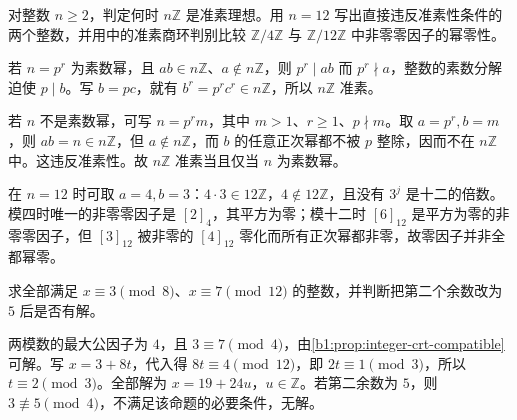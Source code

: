 \begin{exercise}\label{b1:ex:10-primary-integers}
	对整数 \(n\geq2\)，判定何时 \(n\mathbb Z\) 是准素理想。用 \(n=12\) 写出直接违反准素性条件的两个整数，并用中的准素商环判别比较 \(\mathbb Z/4\mathbb Z\) 与 \(\mathbb Z/12\mathbb Z\) 中非零零因子的幂零性。
\end{exercise}
\begin{solution}
	若 \(n=p^r\) 为素数幂，且 \(ab\in n\mathbb Z\)、\(a\notin n\mathbb Z\)，则 \(p^r\mid ab\) 而 \(p^r\nmid a\)，整数的素数分解迫使 \(p\mid b\)。写 \(b=pc\)，就有 \(b^r=p^rc^r\in n\mathbb Z\)，所以 \(n\mathbb Z\) 准素。

	若 \(n\) 不是素数幂，可写 \(n=p^r m\)，其中 \(m>1\)、\(r\geq1\)、\(p\nmid m\)。取 \(a=p^r,b=m\)，则 \(ab=n\in n\mathbb Z\)，但 \(a\notin n\mathbb Z\)，而 \(b\) 的任意正次幂都不被 \(p\) 整除，因而不在 \(n\mathbb Z\) 中。这违反准素性。故 \(n\mathbb Z\) 准素当且仅当 \(n\) 为素数幂。

	在 \(n=12\) 时可取 \(a=4,b=3\)：\(4\cdot3\in12\mathbb Z\)，\(4\notin12\mathbb Z\)，且没有 \(3^j\) 是十二的倍数。模四时唯一的非零零因子是 \([2]_4\)，其平方为零；模十二时 \([6]_{12}\) 是平方为零的非零零因子，但 \([3]_{12}\) 被非零的 \([4]_{12}\) 零化而所有正次幂都非零，故零因子并非全都幂零。
\end{solution}

\begin{exercise}\label{b1:ex:10-compatible-congruences}
	求全部满足 \(x\equiv3\pmod8\)、\(x\equiv7\pmod{12}\) 的整数，并判断把第二个余数改为 \(5\) 后是否有解。
\end{exercise}
\begin{solution}
	两模数的最大公因子为 \(4\)，且 \(3\equiv7\pmod4\)，由\cref{b1:prop:integer-crt-compatible}可解。写 \(x=3+8t\)，代入得 \(8t\equiv4\pmod{12}\)，即 \(2t\equiv1\pmod3\)，所以 \(t\equiv2\pmod3\)。全部解为 \(x=19+24u\)，\(u\in\mathbb Z\)。若第二余数为 \(5\)，则 \(3\not\equiv5\pmod4\)，不满足该命题的必要条件，无解。
\end{solution}

